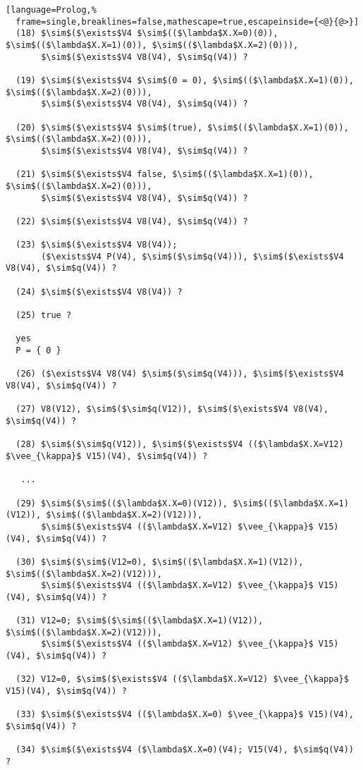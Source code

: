 \documentclass[inscr,ack,preface]{dithesis}
\theoremstyle{definition}
\begin{document}
\begin{lstlisting}[language=Prolog,%
  frame=single,breaklines=false,mathescape=true,escapeinside={<@}{@>}]
  (18) $\sim$($\exists$V4 $\sim$(($\lambda$X.X=0)(0)), $\sim$(($\lambda$X.X=1)(0)), $\sim$(($\lambda$X.X=2)(0))),
       $\sim$($\exists$V4 V8(V4), $\sim$q(V4)) ?

  (19) $\sim$($\exists$V4 $\sim$(0 = 0), $\sim$(($\lambda$X.X=1)(0)), $\sim$(($\lambda$X.X=2)(0))),
       $\sim$($\exists$V4 V8(V4), $\sim$q(V4)) ?

  (20) $\sim$($\exists$V4 $\sim$(true), $\sim$(($\lambda$X.X=1)(0)), $\sim$(($\lambda$X.X=2)(0))),
       $\sim$($\exists$V4 V8(V4), $\sim$q(V4)) ?

  (21) $\sim$($\exists$V4 false, $\sim$(($\lambda$X.X=1)(0)), $\sim$(($\lambda$X.X=2)(0))),
       $\sim$($\exists$V4 V8(V4), $\sim$q(V4)) ?

  (22) $\sim$($\exists$V4 V8(V4), $\sim$q(V4)) ?

  (23) $\sim$($\exists$V4 V8(V4));
       ($\exists$V4 P(V4), $\sim$($\sim$q(V4))), $\sim$($\exists$V4 V8(V4), $\sim$q(V4)) ?

  (24) $\sim$($\exists$V4 V8(V4)) ?

  (25) true ?

  yes
  P = { 0 }

  (26) ($\exists$V4 V8(V4) $\sim$($\sim$q(V4))), $\sim$($\exists$V4 V8(V4), $\sim$q(V4)) ?

  (27) V8(V12), $\sim$($\sim$q(V12)), $\sim$($\exists$V4 V8(V4), $\sim$q(V4)) ?

  (28) $\sim$($\sim$q(V12)), $\sim$($\exists$V4 (($\lambda$X.X=V12) $\vee_{\kappa}$ V15)(V4), $\sim$q(V4)) ?

   ...

  (29) $\sim$($\sim$(($\lambda$X.X=0)(V12)), $\sim$(($\lambda$X.X=1)(V12)), $\sim$(($\lambda$X.X=2)(V12))),
       $\sim$($\exists$V4 (($\lambda$X.X=V12) $\vee_{\kappa}$ V15)(V4), $\sim$q(V4)) ?

  (30) $\sim$($\sim$(V12=0), $\sim$(($\lambda$X.X=1)(V12)), $\sim$(($\lambda$X.X=2)(V12))),
       $\sim$($\exists$V4 (($\lambda$X.X=V12) $\vee_{\kappa}$ V15)(V4), $\sim$q(V4)) ?

  (31) V12=0; $\sim$($\sim$(($\lambda$X.X=1)(V12)), $\sim$(($\lambda$X.X=2)(V12))),
       $\sim$($\exists$V4 (($\lambda$X.X=V12) $\vee_{\kappa}$ V15)(V4), $\sim$q(V4)) ?

  (32) V12=0, $\sim$($\exists$V4 (($\lambda$X.X=V12) $\vee_{\kappa}$ V15)(V4), $\sim$q(V4)) ?

  (33) $\sim$($\exists$V4 (($\lambda$X.X=0) $\vee_{\kappa}$ V15)(V4), $\sim$q(V4)) ?

  (34) $\sim$($\exists$V4 ($\lambda$X.X=0)(V4); V15(V4), $\sim$q(V4)) ?


\end{lstlisting}
\end{document}
